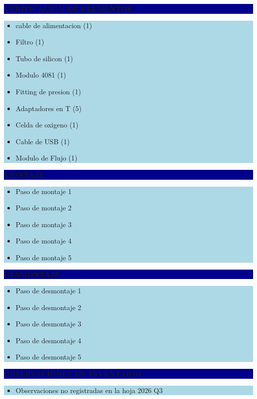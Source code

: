 \documentclass[11pt]{article}
\newcommand{\seccionbanda}[1]{%
  \vspace{0.6em}
  \noindent\colorbox{darkblue}{\parbox{\dimexpr\linewidth-2\fboxsep}{%
    \centering\color{white}\bfseries #1}}\par\vspace{0.6em}
}
\begin{document}
\newpage
\seccionbanda{VERIFICACIÓN DE ELEMENTOS}
\noindent\colorbox{lightblue}{\parbox{\dimexpr\linewidth-2\fboxsep\relax}{%
\begin{itemize}[label=$\square$, itemsep=4pt]
\item cable de alimentacion (1)
\item Filtro (1)
\item Tubo de silicon (1)
\item Modulo 4081 (1)
\item Fitting de presion (1)
\item Adaptadores en T (5)
\item Celda de oxigeno (1)
\item Cable de USB (1)
\item Modulo de Flujo (1)
\end{itemize}
}}\par

\seccionbanda{MONTAJE}
\noindent\colorbox{lightblue}{\parbox{\dimexpr\linewidth-2\fboxsep\relax}{%
\begin{itemize}[label=$\square$, itemsep=4pt]
\item Paso de montaje 1
\item Paso de montaje 2
\item Paso de montaje 3
\item Paso de montaje 4
\item Paso de montaje 5
\end{itemize}
}}\par

\seccionbanda{DESMONTAJE}
\noindent\colorbox{lightblue}{\parbox{\dimexpr\linewidth-2\fboxsep\relax}{%
\begin{itemize}[label=$\square$, itemsep=4pt]
\item Paso de desmontaje 1
\item Paso de desmontaje 2
\item Paso de desmontaje 3
\item Paso de desmontaje 4
\item Paso de desmontaje 5
\end{itemize}
}}\par
\seccionbanda{OBSERVACIONES EN INVENTARIO}
\noindent\colorbox{lightblue}{\parbox{\dimexpr\linewidth-2\fboxsep\relax}{\begin{itemize}[itemsep=4pt]
\item Observaciones no registradas en la hoja 2026 Q3
\end{itemize}}}\par
\end{document}

